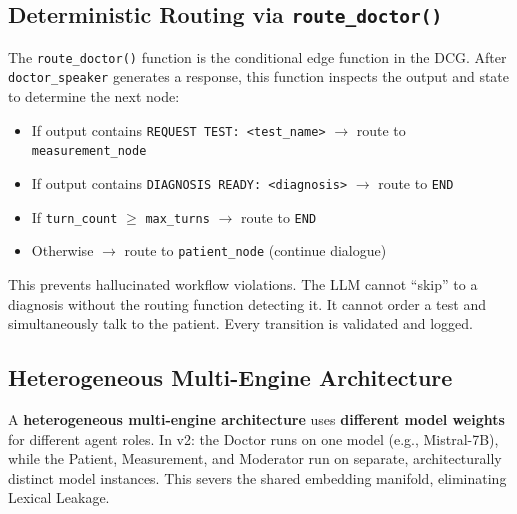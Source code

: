 \subsection{Deterministic Routing via \texttt{route\_doctor()}}

\begin{acadbox}[\textcolor{white}{Academic Definition}]
The \texttt{route\_doctor()} function is the conditional edge function in the DCG. After \texttt{doctor\_speaker} generates a response, this function inspects the output and state to determine the next node:
\begin{itemize}
    \item If output contains \texttt{REQUEST TEST: <test\_name>} $\rightarrow$ route to \texttt{measurement\_node}
    \item If output contains \texttt{DIAGNOSIS READY: <diagnosis>} $\rightarrow$ route to \texttt{END}
    \item If \texttt{turn\_count} $\geq$ \texttt{max\_turns} $\rightarrow$ route to \texttt{END}
    \item Otherwise $\rightarrow$ route to \texttt{patient\_node} (continue dialogue)
\end{itemize}
\end{acadbox}

\begin{mattersbox}[\textcolor{white}{Why It Matters for This Thesis}]
This prevents hallucinated workflow violations. The LLM cannot ``skip'' to a diagnosis without the routing function detecting it. It cannot order a test and simultaneously talk to the patient. Every transition is validated and logged.
\end{mattersbox}

\subsection{Heterogeneous Multi-Engine Architecture}

\begin{acadbox}[\textcolor{white}{Academic Definition}]
A \textbf{heterogeneous multi-engine architecture} uses \textbf{different model weights} for different agent roles. In v2: the Doctor runs on one model (e.g., Mistral-7B), while the Patient, Measurement, and Moderator run on separate, architecturally distinct model instances. This severs the shared embedding manifold, eliminating Lexical Leakage.
\end{acadbox}

